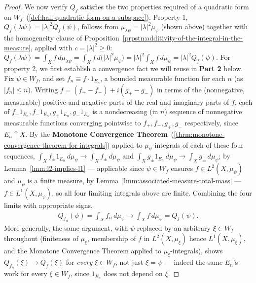 \begin{proof}
We now verify $Q_f$ satisfies the two properties required of a quadratic form on $W_f$~(\ref{def:hall-quadratic-form-on-a-subspace}). Property 1, $Q_f(\lambda\psi) = \lvert \lambda \rvert^2 Q_f(\psi)$, follows from $\mu_{\lambda\psi} = \lvert \lambda \rvert^2 \mu_\psi$ (shown above) together with the homogeneity clause of Proposition~\ref{prpstn:additivity-of-the-integral-in-the-measure}, applied with $c = \lvert \lambda \rvert^2 \ge 0$: $Q_f(\lambda\psi) = \int_X f \, d\mu_{\lambda\psi} = \int_X f \, d\big(\lvert\lambda\rvert^2\mu_\psi\big) = \lvert\lambda\rvert^2\int_X f\,d\mu_\psi = \lvert\lambda\rvert^2 Q_f(\psi)$. For property 2, we first establish a convergence fact we will reuse in \textbf{Part 2} below. Fix $\psi \in W_f$, and set $f_n \equiv f \cdot 1_{E_n}$, a bounded measurable function for each $n$ (as $\lvert f_n \rvert \le n$). Writing $f = (f_+ - f_-) + i(g_+ - g_-)$ in terms of the (nonnegative, measurable) positive and negative parts of the real and imaginary parts of $f$, each of $f_+ 1_{E_n}, f_- 1_{E_n}, g_+ 1_{E_n}, g_- 1_{E_n}$ is a nondecreasing (in $n$) sequence of nonnegative measurable functions converging pointwise to $f_+, f_-, g_+, g_-$ respectively, since $E_n \uparrow X$. By the \textbf{Monotone Convergence Theorem}~(\ref{thrm:monotone-convergence-theorem-for-integrals}) applied to $\mu_\psi$-integrals of each of these four sequences, $\int_X f_\pm 1_{E_n} \, d\mu_\psi \to \int_X f_\pm \, d\mu_\psi$ and $\int_X g_\pm 1_{E_n} \, d\mu_\psi \to \int_X g_\pm \, d\mu_\psi$; by Lemma~\ref{lmm:l2-implies-l1} — applicable since $\psi \in W_f$ ensures $f \in L^2(X, \mu_\psi)$ and $\mu_\psi$ is a finite measure, by Lemma~\ref{lmm:associated-measure-total-mass} — $f \in L^1(X,\mu_\psi)$, so all four limiting integrals above are finite. Combining the four limits with appropriate signs,
\begin{align}
    Q_{f_n}(\psi) = \int_X f_n \, d\mu_\psi \longrightarrow \int_X f \, d\mu_\psi = Q_f(\psi). \tag{$\dagger$}
\end{align}
More generally, the same argument, with $\psi$ replaced by an arbitrary $\xi \in W_f$ throughout (finiteness of $\mu_\xi$, membership of $f$ in $L^2(X,\mu_\xi)$ hence $L^1(X,\mu_\xi)$, and the Monotone Convergence Theorem applied to $\mu_\xi$-integrals), shows $Q_{f_n}(\xi) \to Q_f(\xi)$ for \textit{every} $\xi \in W_f$, not just $\xi = \psi$ — indeed the same $E_n$'s work for every $\xi \in W_f$, since $1_{E_n}$ does not depend on $\xi$.


\end{proof}
